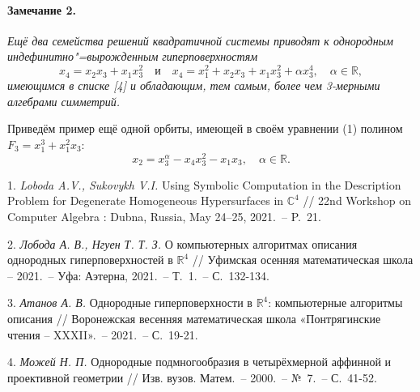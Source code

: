 \paragraph{Замечание 2.} {\it
	Ещё два семейства решений квадратичной системы приводят к однородным индефинитно"=вырожденным гиперповерхностям
	\begin{equation*}
		x_4 = x_2 x_3 + x_1 x_3^2 \quad \text{и} \quad x_4 = x_1^2 + x_2 x_3 + x_1 x_3^2 + \alpha x_3^4,  \quad \alpha \in \mathbb{R},
	\end{equation*}
	имеющимся в списке [4] и обладающим, тем самым, более чем 3-мерными алгебрами симметрий.
}

Приведём пример ещё одной орбиты, имеющей в своём уравнении (1) полином $F_3 = x_1^3 + x_1^2x_3$: \begin{equation*}
	x_2 = x_3^{\alpha} - x_4x_3^2 - x_1x_3, \quad \alpha \in \mathbb{R}.
\end{equation*}

\litlist

1. {\it Loboda A.V., Sukovykh V.I.} Using Symbolic Computation in the Description
Problem for Degenerate Homogeneous Hy\-per\-sur\-fa\-ces in $\mathbb{C}^4$ // 22nd Workshop on Computer Algebra : Dubna, Russia, May 24–25, 2021.~-- P.~21.

2. {\it Лобода А. В., Нгуен Т. Т. З.} О компьютерных алгоритмах описания однородных гиперповерхностей в $\mathbb{R}^4$ // Уфимская осенняя математическая школа -- 2021.~-- Уфа: Аэтерна, 2021.~-- Т.~1.~-- С.~132-134.

3. {\it Атанов А. В.} Однородные гиперповерхности в $\mathbb{R}^4$: компьютерные алгоритмы описания // Воронежская весенняя математическая школа «Понтрягинские чтения -- XXXII».~-- 2021.~-- С.~19-21.

4. {\it Можей Н. П.} Однородные подмногообразия в четырёхмерной аффинной и проективной геометрии // Изв. вузов. Матем.~-- 2000.~-- №~7.~-- С.~41-52.

